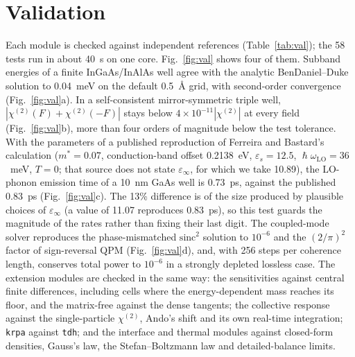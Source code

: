 \documentclass[11pt]{article}
\newcommand{\chitwo}{\chi^{(2)}}
\newcommand{\code}[1]{\texttt{#1}}
\begin{document}
\section{Validation}
Each module is checked against independent references (Table~\ref{tab:val}); the 58 tests run in about 40~s on one core. Fig.~\ref{fig:val} shows four of them. Subband energies of a finite InGaAs/InAlAs well agree with the analytic BenDaniel--Duke solution to 0.04~meV on the default 0.5~\AA{} grid, with second-order convergence (Fig.~\ref{fig:val}a). In a self-consistent mirror-symmetric triple well, $|\chitwo(F)+\chitwo(-F)|$ stays below $4\times10^{-11}|\chitwo|$ at every field (Fig.~\ref{fig:val}b), more than four orders of magnitude below the test tolerance. With the parameters of a published reproduction of Ferreira and Bastard's calculation \cite{Ferreira1989,nextnanoBench} ($m^*=0.07$, conduction-band offset 0.2138~eV, $\varepsilon_s=12.5$, $\hslash\omega_\mathrm{LO}=36$~meV, $T=0$; that source does not state $\varepsilon_\infty$, for which we take 10.89), the LO-phonon emission time of a 10~nm GaAs well is 0.73~ps, against the published 0.83~ps (Fig.~\ref{fig:val}c). The 13\% difference is of the size produced by plausible choices of $\varepsilon_\infty$ (a value of 11.07 reproduces 0.83~ps), so this test guards the magnitude of the rates rather than fixing their last digit. The coupled-mode solver reproduces the phase-mismatched $\mathrm{sinc}^2$ solution to $10^{-6}$ and the $(2/\pi)^2$ factor of sign-reversal QPM (Fig.~\ref{fig:val}d), and, with 256 steps per coherence length, conserves total power to $10^{-6}$ in a strongly depleted lossless case. The extension modules are checked in the same way: the sensitivities against central finite differences, including cells where the energy-dependent mass reaches its floor, and the matrix-free against the dense tangents; the collective response against the single-particle $\chitwo$, Ando's shift and its own real-time integration; \code{krpa} against \code{tdh}; and the interface and thermal modules against closed-form densities, Gauss's law, the Stefan--Boltzmann law and detailed-balance limits.
\end{document}
